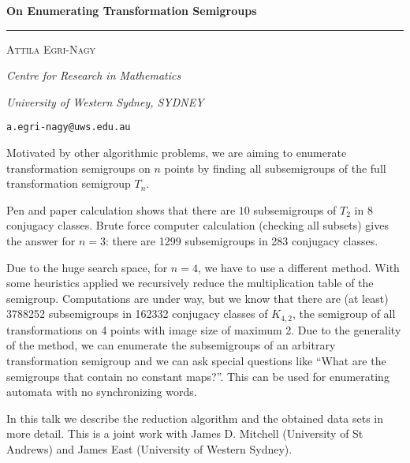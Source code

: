 \documentclass[11pt,reqno]{amsart}
\begin{document}
\setlength{\parindent}{0pt} \thispagestyle{empty}


\begin{flushleft}

\large

\textbf{On Enumerating Transformation Semigroups}

\end{flushleft}


\normalsize

\vspace{-2.25mm}

\rule{\textwidth}{1.5pt}

\vspace{2mm}


\begin{flushright}

\large

\textsc{Attila Egri-Nagy}

\normalsize

\vspace{3pt}


\scriptsize

\textit{Centre for Research in Mathematics}

\textit{University of Western Sydney, SYDNEY}

\texttt{a.egri-nagy@uws.edu.au}

\end{flushright}

\normalsize

\setlength{\parskip}{11pt}\baselineskip


Motivated by other algorithmic problems, we are aiming to enumerate transformation semigroups on $n$ points by finding all subsemigroups of the full transformation semigroup $T_n$.

Pen and paper calculation shows that there are $10$ subsemigroups of $T_2$ in $8$ conjugacy classes.
Brute force computer calculation (checking all subsets) gives the answer for $n=3$: there are 1299 subsemigroups in 283 conjugacy classes.

Due to the huge search space, for $n=4$,  we have to use a different method.
With some heuristics applied we recursively reduce the multiplication table of the semigroup.
Computations are under way, but we know that there are (at least) 3788252 subsemigroups in 162332 conjugacy classes of $K_{4,2}$, the semigroup of all transformations on 4 points with image size of maximum 2.
Due to the generality of the method, we can enumerate the subsemigroups of an arbitrary transformation semigroup and we can ask special questions like ``What are the semigroups that contain no constant maps?''. This can be used for enumerating automata with no synchronizing words.

In this talk we describe the reduction algorithm and the obtained data sets in more detail.
This is a joint work with {\sc James D. Mitchell} (University of St Andrews) and {\sc James East} (University of Western Sydney).
\end{document}
